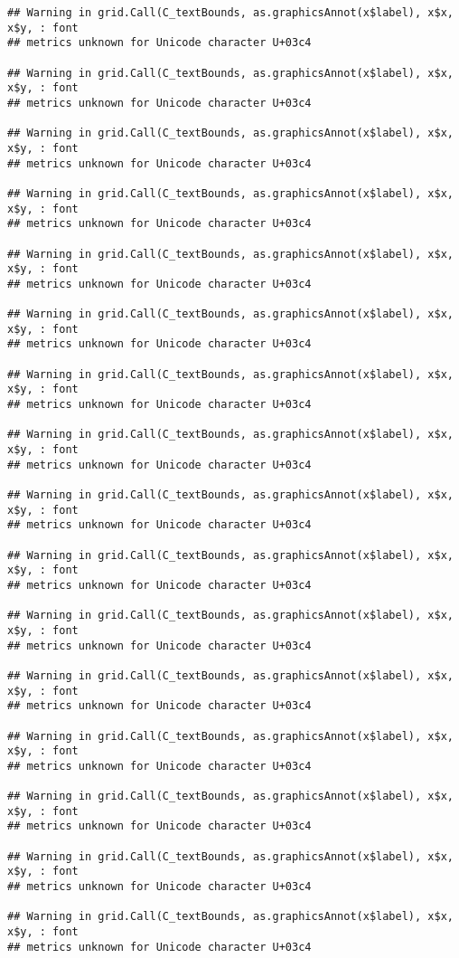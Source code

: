 \documentclass[
]{article}
\begin{document}
\begin{verbatim}
## Warning in grid.Call(C_textBounds, as.graphicsAnnot(x$label), x$x, x$y, : font
## metrics unknown for Unicode character U+03c4

## Warning in grid.Call(C_textBounds, as.graphicsAnnot(x$label), x$x, x$y, : font
## metrics unknown for Unicode character U+03c4

## Warning in grid.Call(C_textBounds, as.graphicsAnnot(x$label), x$x, x$y, : font
## metrics unknown for Unicode character U+03c4

## Warning in grid.Call(C_textBounds, as.graphicsAnnot(x$label), x$x, x$y, : font
## metrics unknown for Unicode character U+03c4

## Warning in grid.Call(C_textBounds, as.graphicsAnnot(x$label), x$x, x$y, : font
## metrics unknown for Unicode character U+03c4

## Warning in grid.Call(C_textBounds, as.graphicsAnnot(x$label), x$x, x$y, : font
## metrics unknown for Unicode character U+03c4

## Warning in grid.Call(C_textBounds, as.graphicsAnnot(x$label), x$x, x$y, : font
## metrics unknown for Unicode character U+03c4

## Warning in grid.Call(C_textBounds, as.graphicsAnnot(x$label), x$x, x$y, : font
## metrics unknown for Unicode character U+03c4

## Warning in grid.Call(C_textBounds, as.graphicsAnnot(x$label), x$x, x$y, : font
## metrics unknown for Unicode character U+03c4

## Warning in grid.Call(C_textBounds, as.graphicsAnnot(x$label), x$x, x$y, : font
## metrics unknown for Unicode character U+03c4

## Warning in grid.Call(C_textBounds, as.graphicsAnnot(x$label), x$x, x$y, : font
## metrics unknown for Unicode character U+03c4

## Warning in grid.Call(C_textBounds, as.graphicsAnnot(x$label), x$x, x$y, : font
## metrics unknown for Unicode character U+03c4

## Warning in grid.Call(C_textBounds, as.graphicsAnnot(x$label), x$x, x$y, : font
## metrics unknown for Unicode character U+03c4

## Warning in grid.Call(C_textBounds, as.graphicsAnnot(x$label), x$x, x$y, : font
## metrics unknown for Unicode character U+03c4

## Warning in grid.Call(C_textBounds, as.graphicsAnnot(x$label), x$x, x$y, : font
## metrics unknown for Unicode character U+03c4

## Warning in grid.Call(C_textBounds, as.graphicsAnnot(x$label), x$x, x$y, : font
## metrics unknown for Unicode character U+03c4


\end{verbatim}
\end{document}

